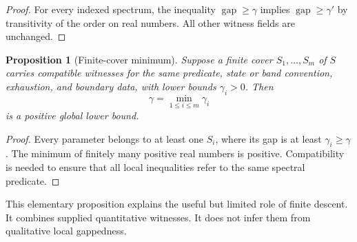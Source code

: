 \documentclass[12pt]{article}
\newtheorem{proposition}[theorem]{Proposition}
\theoremstyle{definition}
\theoremstyle{remark}
\begin{document}
\begin{proof}
For every indexed spectrum, the inequality
$\operatorname{gap}\geq\gamma$ implies
$\operatorname{gap}\geq\gamma'$ by transitivity of the order on real numbers.
All other witness fields are unchanged.
\end{proof}

\begin{proposition}[Finite-cover minimum]
Suppose a finite cover $S_1,\ldots,S_m$ of $S$ carries compatible witnesses
for the same predicate, state or band convention, exhaustion, and boundary
data, with lower bounds $\gamma_i>0$. Then
\[
\gamma=\min_{1\leq i\leq m}\gamma_i
\]
is a positive global lower bound.
\end{proposition}

\begin{proof}
Every parameter belongs to at least one $S_i$, where its gap is at least
$\gamma_i\geq\gamma$. The minimum of finitely many positive real numbers is
positive. Compatibility is needed to ensure that all local inequalities refer
to the same spectral predicate.
\end{proof}

This elementary proposition explains the useful but limited role of finite
descent. It combines supplied quantitative witnesses. It does not infer them
from qualitative local gappedness.
\end{document}
